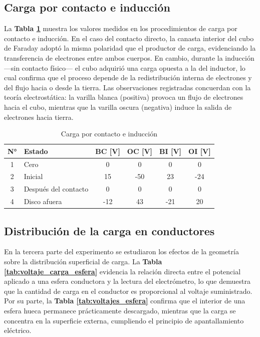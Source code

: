 \documentclass[12pt,a4paper]{article}
\begin{document}
\subsection{Carga por contacto e inducción}
La \textbf{Tabla \ref{tab:contacto_induccion}} muestra los valores medidos en los procedimientos de carga por contacto e inducción.  
En el caso del contacto directo, la canasta interior del cubo de Faraday adoptó la misma polaridad que el productor de carga, evidenciando la transferencia de electrones entre ambos cuerpos.  
En cambio, durante la inducción —sin contacto físico— el cubo adquirió una carga opuesta a la del inductor, lo cual confirma que el proceso depende de la redistribución interna de electrones y del flujo hacia o desde la tierra.  
Las observaciones registradas concuerdan con la teoría electrostática: la varilla blanca (positiva) provoca un flujo de electrones hacia el cubo, mientras que la varilla oscura (negativa) induce la salida de electrones hacia tierra.

\begin{table}[H]
\centering
\caption{Carga por contacto e inducción}
\begin{tabular}{|c|l|c|c|c|c|}
\hline
\textbf{N°} & \textbf{Estado} & \textbf{BC [V]} & \textbf{OC [V]} & \textbf{BI [V]} & \textbf{OI [V]} \\ \hline
1 & Cero & 0 & 0 & 0 & 0 \\ \hline
2 & Inicial & 15 & -50 & 23 & -24 \\ \hline
3 & Después del contacto & 0 & 0 & 0 & 0 \\ \hline
4 & Disco afuera & -12 & 43 & -21 & 20 \\ \hline
\end{tabular}
\label{tab:contacto_induccion}
\end{table}

\subsection{Distribución de la carga en conductores}
En la tercera parte del experimento se estudiaron los efectos de la geometría sobre la distribución superficial de carga.  
La \textbf{Tabla \ref{tab:voltaje_carga_esfera}} evidencia la relación directa entre el potencial aplicado a una esfera conductora y la lectura del electrómetro, lo que demuestra que la cantidad de carga en el conductor es proporcional al voltaje suministrado.  
Por su parte, la \textbf{Tabla \ref{tab:voltajes_esfera}} confirma que el interior de una esfera hueca permanece prácticamente descargado, mientras que la carga se concentra en la superficie externa, cumpliendo el principio de apantallamiento eléctrico.
\end{document}
